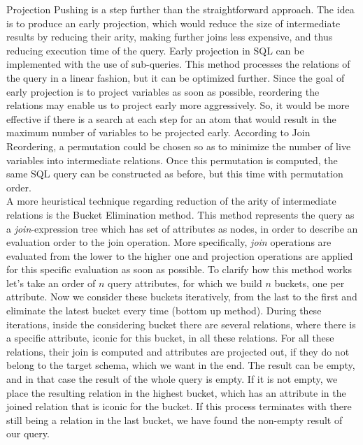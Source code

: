 Projection Pushing is a step further than the straightforward approach. The idea is to produce an early projection, which would reduce the size of intermediate results by reducing their arity, making further joins less expensive, and thus reducing execution time of the query. Early projection in SQL can be implemented with the use of sub-queries. This method processes the relations of the query in a linear fashion, but it can be optimized further. Since the goal of early projection is to project variables as soon as possible, reordering the relations may enable us to project early more aggressively. So, it would be more effective if there is a search at each step for an atom that would result in the maximum number of variables to be projected early. According to Join Reordering, a permutation could be chosen so as to minimize the number of live variables into intermediate relations. Once this permutation is computed, the same SQL query can be constructed as before, but this time with permutation order. \\

A more heuristical technique regarding reduction of the arity of intermediate relations is the Bucket Elimination method. This method represents the query as a \textit{join}-expression tree which has set of attributes as nodes, in order to describe an evaluation order to the join operation. More specifically, \textit{join} operations are evaluated from the lower to the higher one and projection operations are applied for this specific evaluation as soon as possible. To clarify how this method works let's take an order of $n$ query attributes, for which we build $n$ buckets, one per attribute. Now we consider these buckets iteratively, from the last to the first and eliminate the latest bucket every time (bottom up method). During these iterations, inside the considering bucket there are several relations, where there is a specific attribute, iconic for this bucket, in all these relations. For all these relations, their join is computed and attributes are projected out, if they do not belong to the target schema, which we want in the end. The result can be empty, and in that case the result of the whole query is empty. If it is not empty, we place the resulting relation in the highest bucket, which has an attribute in the joined relation that is iconic for the bucket. If this process terminates with there still being a relation in the last bucket, we have found the non-empty result of our query.
